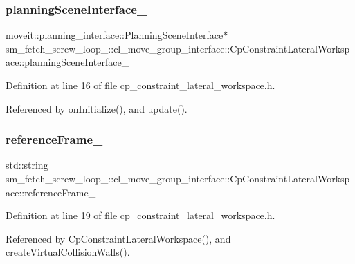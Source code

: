 \subsubsection{\texorpdfstring{planning\+Scene\+Interface\+\_\+}{planningSceneInterface\_}}
{\footnotesize\ttfamily moveit\+::planning\+\_\+interface\+::\+Planning\+Scene\+Interface$\ast$ sm\+\_\+fetch\+\_\+screw\+\_\+loop\+\_\+::cl\+\_\+move\+\_\+group\+\_\+interface\+::\+Cp\+Constraint\+Lateral\+Workspace\+::planning\+Scene\+Interface\+\_\+\hspace{0.3cm}{\ttfamily [private]}}



Definition at line 16 of file cp\+\_\+constraint\+\_\+lateral\+\_\+workspace.\+h.



Referenced by on\+Initialize(), and update().

\mbox{\label{classsm__fetch__screw__loop__1_1_1cl__move__group__interface_1_1CpConstraintLateralWorkspace_a3f1268890fe5063ae3d87d8105a4570b}} 
\subsubsection{\texorpdfstring{reference\+Frame\+\_\+}{referenceFrame\_}}
{\footnotesize\ttfamily std\+::string sm\+\_\+fetch\+\_\+screw\+\_\+loop\+\_\+::cl\+\_\+move\+\_\+group\+\_\+interface\+::\+Cp\+Constraint\+Lateral\+Workspace\+::reference\+Frame\+\_\+\hspace{0.3cm}{\ttfamily [private]}}



Definition at line 19 of file cp\+\_\+constraint\+\_\+lateral\+\_\+workspace.\+h.



Referenced by Cp\+Constraint\+Lateral\+Workspace(), and create\+Virtual\+Collision\+Walls().

